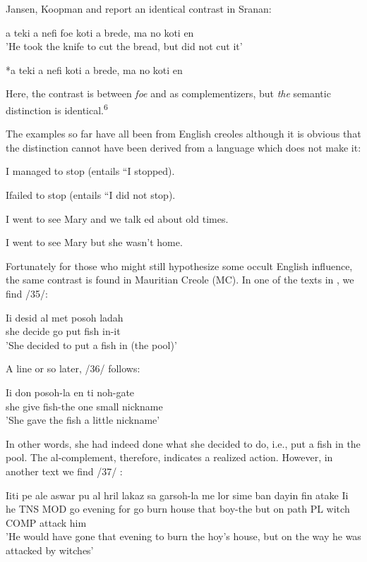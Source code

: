 Jansen, Koopman and \citet{Muysken1978} report an identical contrast in Sranan:

\ea\label{ex:29}
 a teki a nefi foe koti a brede, ma no koti en\\
\glt'He took the knife to cut the bread, but did not cut it'
\z



\ea\label{ex:30}
 *a teki a nefi koti a brede, ma no koti en
\z

Here, the contrast is between \textit{foe} and {\zero} as complementizers, but \textit{the}
semantic distinction is identical.\textsuperscript{6}

The examples so far have all been from English creoles although it is obvious that the distinction cannot have been derived from a lan\-guage which does not make it:

\ea\label{ex:31}
 {I} {managed} {to} {stop} (entails ``I stopped{\textquotedbl}).
\z

\ea\label{ex:32}
 {I}{failed} {to} {stop} (entails ``I did not stop{\textquotedbl}).
\z

\ea\label{ex:33}
I {went} {to} {see} {Mary} {and} {we} {talk} {ed} {about} {old} {times.}
\z

\ea\label{ex:34}
 {I} {went} {to} {see} {Mary} {but} {she} {wasn't} {home.}
\z

Fortunately for those who might still hypothesize some occult English influence, the same contrast is found in Mauritian Creole (MC). In one of the texts in \citet{Baker1972}, we find /35/:

\ea\label{ex:35}
\gll  Ii desid al met posoh ladah \\
she decide go put fish in-it\\
\glt'She decided to put a fish in (the pool)'
\z

 A line or so later, /36/ follows:

\ea\label{ex:36}
 \gll Ii don posoh-la en ti noh-gate\\
she give fish-the one small nickname\\
\glt 'She gave the fish a little nickname'
\z



% 

In other words, she had indeed done what she decided to do, i.e., put a fish in the pool. The al-complement, therefore, indicates a realized action. However, in another text we find /37/ :

\ea\label{ex:37}
 \gll Iiti pe ale aswar pu al hril lakaz sa garsoh-la me lor sime ban dayin fin atake Ii\\
he TNS MOD go evening for go burn house that boy-the  but on path PL witch COMP attack him\\
\glt 'He would have gone that evening to burn the hoy's house, but on the way he was attacked by witches'
\z

